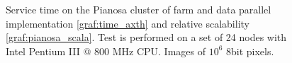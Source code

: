 \begin{figure}[p]
\centering
{}
\caption{ Service time on the Pianosa cluster of farm and data parallel implementation \ref{graf:time_axth} and relative scalability \ref{graf:pianosa_scala}.  Test is performed on a set of 24 nodes with Intel Pentium III @ 800 MHz CPU. Images of $10^6$ 8bit pixels.}
\label{chart:pianosa}
\end{figure}

